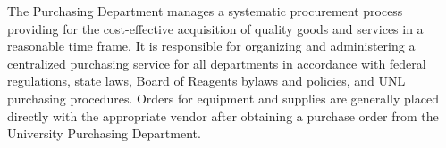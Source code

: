 The Purchasing Department manages a systematic procurement process 
providing for the cost-effective acquisition of quality goods and 
services in a reasonable time frame. It is responsible for organizing 
and administering a centralized purchasing service for all departments 
in accordance with federal regulations, state laws, Board of Reagents 
bylaws and policies, and UNL purchasing procedures. Orders for equipment 
and supplies are generally placed directly with the appropriate vendor 
after obtaining a purchase order from the University Purchasing 
Department.
